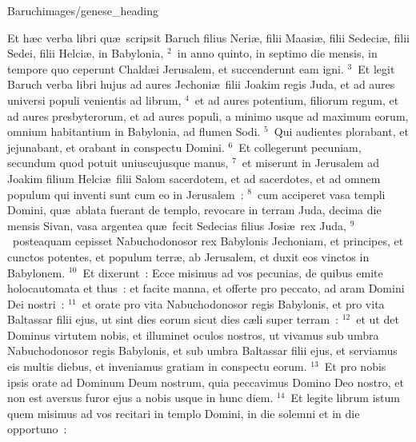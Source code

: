 {Baruch}{images/genese_heading}


\bchapter
\lettrine[lines=6,image=true,loversize=0.05,lraise=-0.03]{E}{}t h\ae c verba libri qu\ae\ scripsit Baruch filius Neri\ae , filii Maasi\ae , filii Sedeci\ae , filii Sedei, filii Helci\ae , in Babylonia,
${}^{2}$~in anno quinto, in septimo die mensis, in tempore quo ceperunt Chald\ae i Jerusalem, et succenderunt eam igni.
${}^{3}$~Et legit Baruch verba libri hujus ad aures Jechoni\ae\ filii Joakim regis Juda, et ad aures universi populi venientis ad librum,
${}^{4}$~et ad aures potentium, filiorum regum, et ad aures presbyterorum, et ad aures populi, a minimo usque ad maximum eorum, omnium habitantium in Babylonia, ad flumen Sodi.
${}^{5}$~Qui audientes plorabant, et jejunabant, et orabant in conspectu Domini.
${}^{6}$~Et collegerunt pecuniam, secundum quod potuit uniuscujusque manus,
${}^{7}$~et miserunt in Jerusalem ad Joakim filium Helci\ae\ filii Salom sacerdotem, et ad sacerdotes, et ad omnem populum qui inventi sunt cum eo in Jerusalem~:
${}^{8}$~cum acciperet vasa templi Domini, qu\ae\ ablata fuerant de templo, revocare in terram Juda, decima die mensis Sivan, vasa argentea qu\ae\ fecit Sedecias filius Josi\ae\ rex Juda,
${}^{9}$~posteaquam cepisset Nabuchodonosor rex Babylonis Jechoniam, et principes, et cunctos potentes, et populum terr\ae , ab Jerusalem, et duxit eos vinctos in Babylonem.
${}^{10}$~Et dixerunt~: Ecce misimus ad vos pecunias, de quibus emite holocautomata et thus~: et facite manna, et offerte pro peccato, ad aram Domini Dei nostri~:
${}^{11}$~et orate pro vita Nabuchodonosor regis Babylonis, et pro vita Baltassar filii ejus, ut sint dies eorum sicut dies c\ae li super terram~:
${}^{12}$~et ut det Dominus virtutem nobis, et illuminet oculos nostros, ut vivamus sub umbra Nabuchodonosor regis Babylonis, et sub umbra Baltassar filii ejus, et serviamus eis multis diebus, et inveniamus gratiam in conspectu eorum.
${}^{13}$~Et pro nobis ipsis orate ad Dominum Deum nostrum, quia peccavimus Domino Deo nostro, et non est aversus furor ejus a nobis usque in hunc diem.
${}^{14}$~Et legite librum istum quem misimus ad vos recitari in templo Domini, in die solemni et in die opportuno~:
